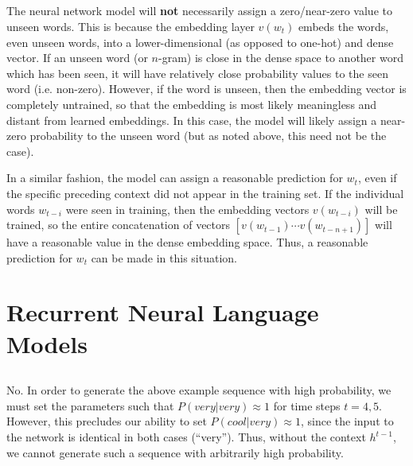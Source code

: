 \documentclass[psamsfonts]{amsart}
\theoremstyle{definition}
\theoremstyle{remark}
\numberwithin{equation}{section}
\begin{document}
\subsection{} The neural network model will {\bf not} necessarily assign a zero/near-zero value to unseen words. This is because the embedding layer $v(w_{t})$ embeds the words, even unseen words, into a lower-dimensional (as opposed to one-hot) and dense vector. If an unseen word (or $n$-gram) is close in the dense space to another word which has been seen, it will have relatively close probability values to the seen word (i.e. non-zero). However, if the word is unseen, then the embedding vector is completely untrained, so that the embedding is most likely meaningless and distant from learned embeddings. In this case, the model will likely assign a near-zero probability to the unseen word (but as noted above, this need not be the case).

In a similar fashion, the model can assign a reasonable prediction for $w_t$, even if the specific preceding context did not appear in the training set. If the individual words $w_{t-i}$ were seen in training, then the embedding vectors $v(w_{t-i})$ will be trained, so the entire concatenation of vectors $[v(w_{t-1}) \cdots v(w_{t-n+1})]$ will have a reasonable value in the dense embedding space. Thus, a reasonable prediction for $w_t$ can be made in this situation.

\subsection{}

\section{Recurrent Neural Language Models}

\subsection{} No. In order to generate the above example sequence with high probability, we must set the parameters such that $P(very|very) \approx 1$ for time steps $t = 4, 5$. However, this precludes our ability to set $P(cool|very) \approx 1$, since the input to the network is identical in both cases (``very''). Thus, without the context $h^{t-1}$, we cannot generate such a sequence with arbitrarily high probability.
\end{document}
